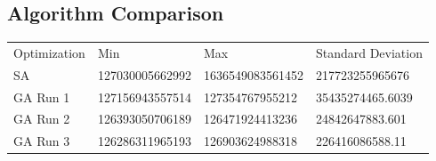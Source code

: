 \subsection{Algorithm Comparison}
\begin{tabular}{llll}
Optimization	& Min			& Max			& Standard Deviation \\
SA		& 127030005662992 	& 1636549083561452	& 217723255965676 \\
GA Run 1	& 127156943557514	& 127354767955212	& 35435274465.6039 \\
GA Run 2	& 126393050706189	& 126471924413236	& 24842647883.601 \\
GA Run 3	& 126286311965193	& 126903624988318	& 226416086588.11 \\
\end{tabular}
